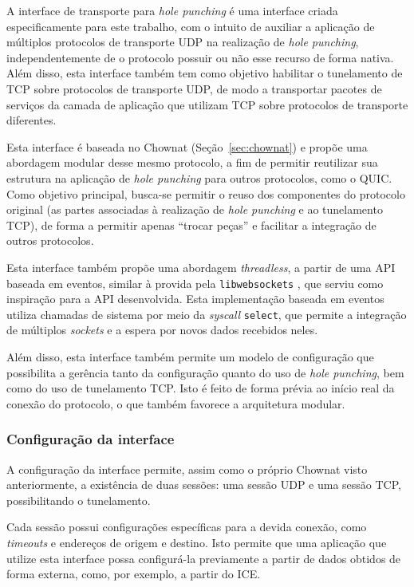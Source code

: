 A interface de transporte para \textit{hole punching} é uma interface criada especificamente para este trabalho, com o intuito de auxiliar a aplicação de múltiplos protocolos de transporte UDP na realização de \textit{hole punching}, independentemente de o protocolo possuir ou não esse recurso de forma nativa. Além disso, esta interface também tem como objetivo habilitar o tunelamento de TCP sobre protocolos de transporte UDP, de modo a transportar pacotes de serviços da camada de aplicação que utilizam TCP sobre protocolos de transporte diferentes.

Esta interface é baseada no Chownat (Seção~\ref{sec:chownat}) e propõe uma abordagem modular desse mesmo protocolo, a fim de permitir reutilizar sua estrutura na aplicação de \textit{hole punching} para outros protocolos, como o QUIC. Como objetivo principal, busca-se permitir o reuso dos componentes do protocolo original (as partes associadas à realização de \textit{hole punching} e ao tunelamento TCP), de forma a permitir apenas ``trocar peças'' e facilitar a integração de outros protocolos.

Esta interface também propõe uma abordagem \textit{threadless}, a partir de uma API baseada em eventos, similar à provida pela \texttt{libwebsockets} \citep{libwebsockets},
que serviu como inspiração para a API desenvolvida. Esta implementação baseada em eventos utiliza chamadas de sistema por meio da \textit{syscall} \texttt{select}, que permite a integração de múltiplos \textit{sockets} e a espera por novos dados recebidos neles.

Além disso, esta interface também permite um modelo de configuração que possibilita a gerência tanto da configuração quanto do uso de \textit{hole punching}, bem como do uso de tunelamento TCP. Isto é feito de forma prévia ao início real da conexão do protocolo, o que também favorece a arquitetura modular.

\subsubsection{Configuração da interface}

A configuração da interface permite, assim como o próprio Chownat visto anteriormente, a existência de duas sessões: uma sessão UDP e uma sessão TCP, possibilitando o tunelamento.

Cada sessão possui configurações específicas para a devida conexão, como \textit{timeouts} e endereços de origem e destino. Isto permite que uma aplicação que utilize esta interface possa configurá-la previamente a partir de dados obtidos de forma externa, como, por exemplo, a partir do ICE.

